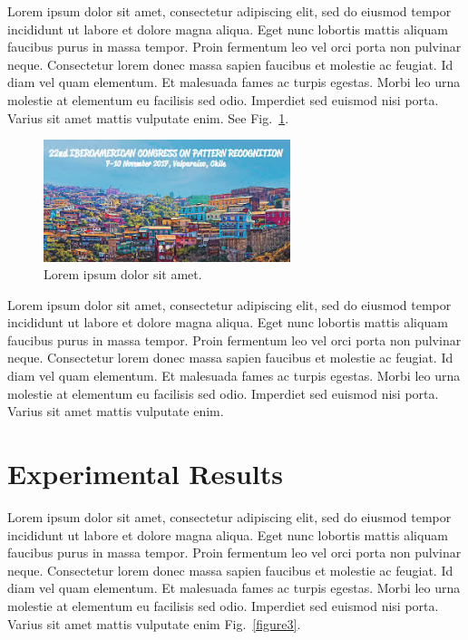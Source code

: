 \documentclass[runningheads]{llncs}
\begin{document}
Lorem ipsum dolor sit amet, consectetur adipiscing elit, sed do eiusmod tempor incididunt ut labore et dolore magna aliqua. Eget nunc lobortis mattis aliquam faucibus purus in massa tempor. Proin fermentum leo vel orci porta non pulvinar neque. Consectetur lorem donec massa sapien faucibus et molestie ac feugiat. Id diam vel quam elementum. Et malesuada fames ac turpis egestas. Morbi leo urna molestie at elementum eu facilisis sed odio. Imperdiet sed euismod nisi porta. Varius sit amet mattis vulputate enim. See Fig.~\ref{figure2}.

\begin{figure}[!htbp]
\centerline{\includegraphics[width=72mm]{images/image-example.jpeg}}
\caption{Lorem ipsum dolor sit amet.} \label{figure2}
\end{figure}

Lorem ipsum dolor sit amet, consectetur adipiscing elit, sed do eiusmod tempor incididunt ut labore et dolore magna aliqua. Eget nunc lobortis mattis aliquam faucibus purus in massa tempor. Proin fermentum leo vel orci porta non pulvinar neque. Consectetur lorem donec massa sapien faucibus et molestie ac feugiat. Id diam vel quam elementum. Et malesuada fames ac turpis egestas. Morbi leo urna molestie at elementum eu facilisis sed odio. Imperdiet sed euismod nisi porta. Varius sit amet mattis vulputate enim.







\section{Experimental Results}

Lorem ipsum dolor sit amet, consectetur adipiscing elit, sed do eiusmod tempor incididunt ut labore et dolore magna aliqua. Eget nunc lobortis mattis aliquam faucibus purus in massa tempor. Proin fermentum leo vel orci porta non pulvinar neque. Consectetur lorem donec massa sapien faucibus et molestie ac feugiat. Id diam vel quam elementum. Et malesuada fames ac turpis egestas. Morbi leo urna molestie at elementum eu facilisis sed odio. Imperdiet sed euismod nisi porta. Varius sit amet mattis vulputate enim Fig.~\ref{figure3}.
\end{document}
